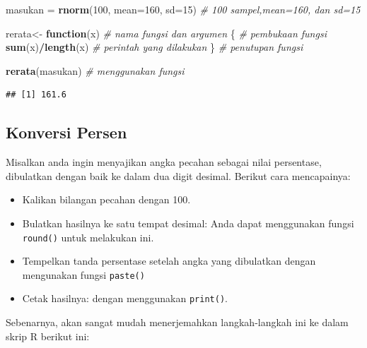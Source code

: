\documentclass[
]{book}
\newenvironment{Shaded}{\begin{snugshade}}{\end{snugshade}}
\newcommand{\AttributeTok}[1]{\textcolor[rgb]{0.13,0.29,0.53}{#1}}
\newcommand{\CommentTok}[1]{\textcolor[rgb]{0.56,0.35,0.01}{\textit{#1}}}
\newcommand{\ControlFlowTok}[1]{\textcolor[rgb]{0.13,0.29,0.53}{\textbf{#1}}}
\newcommand{\DecValTok}[1]{\textcolor[rgb]{0.00,0.00,0.81}{#1}}
\newcommand{\FunctionTok}[1]{\textcolor[rgb]{0.13,0.29,0.53}{\textbf{#1}}}
\newcommand{\NormalTok}[1]{#1}
\newcommand{\OtherTok}[1]{\textcolor[rgb]{0.56,0.35,0.01}{#1}}
\newcommand{\SpecialCharTok}[1]{\textcolor[rgb]{0.81,0.36,0.00}{\textbf{#1}}}
\providecommand{\tightlist}{%
  \setlength{\itemsep}{0pt}\setlength{\parskip}{0pt}}
\begin{document}
\begin{Shaded}
\begin{Highlighting}[]
\NormalTok{masukan }\OtherTok{=} \FunctionTok{rnorm}\NormalTok{(}\DecValTok{100}\NormalTok{, }\AttributeTok{mean=}\DecValTok{160}\NormalTok{, }\AttributeTok{sd=}\DecValTok{15}\NormalTok{)        }\CommentTok{\# 100 sampel,mean=160, dan sd=15 }

\NormalTok{rerata}\OtherTok{\textless{}{-}} \ControlFlowTok{function}\NormalTok{(x)                         }\CommentTok{\# nama fungsi dan argumen   }
\NormalTok{\{                                            }\CommentTok{\# pembukaan fungsi}
  \FunctionTok{sum}\NormalTok{(x)}\SpecialCharTok{/}\FunctionTok{length}\NormalTok{(x)                           }\CommentTok{\# perintah yang dilakukan }
\NormalTok{\}                                            }\CommentTok{\# penutupan fungsi}

\FunctionTok{rerata}\NormalTok{(masukan)                              }\CommentTok{\# menggunakan fungsi}
\end{Highlighting}
\end{Shaded}

\begin{verbatim}
## [1] 161.6
\end{verbatim}

\hypertarget{konversi-persen}{%
\subsection{Konversi Persen}\label{konversi-persen}}

Misalkan anda ingin menyajikan angka pecahan sebagai nilai persentase, dibulatkan dengan baik ke dalam dua digit desimal. Berikut cara mencapainya:

\begin{itemize}
\tightlist
\item
  Kalikan bilangan pecahan dengan 100.
\item
  Bulatkan hasilnya ke satu tempat desimal: Anda dapat menggunakan fungsi \texttt{round()} untuk melakukan ini.
\item
  Tempelkan tanda persentase setelah angka yang dibulatkan dengan mengunakan fungsi \texttt{paste()}
\item
  Cetak hasilnya: dengan menggunakan \texttt{print()}.
\end{itemize}

Sebenarnya, akan sangat mudah menerjemahkan langkah-langkah ini ke dalam skrip R berikut ini:
\end{document}

